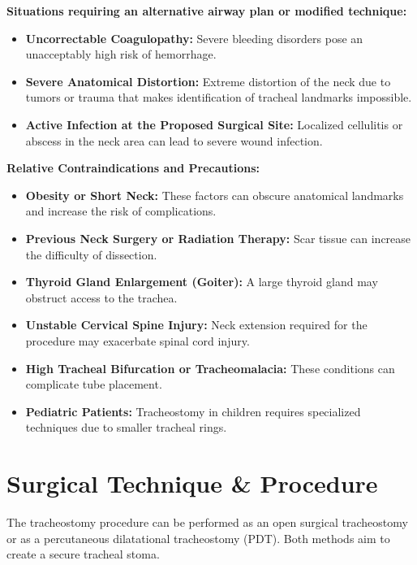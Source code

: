 \textbf{Situations requiring an alternative airway plan or modified technique:}
\begin{itemize}
  \item \textbf{Uncorrectable Coagulopathy:} Severe bleeding disorders pose an unacceptably high risk of hemorrhage.
  
  \item \textbf{Severe Anatomical Distortion:} Extreme distortion of the neck due to tumors or trauma that makes identification of tracheal landmarks impossible.

  \item \textbf{Active Infection at the Proposed Surgical Site:} Localized cellulitis or abscess in the neck area can lead to severe wound infection.
\end{itemize}

\textbf{Relative Contraindications and Precautions:}
\begin{itemize}
  \item \textbf{Obesity or Short Neck:} These factors can obscure anatomical landmarks and increase the risk of complications.

  \item \textbf{Previous Neck Surgery or Radiation Therapy:} Scar tissue can increase the difficulty of dissection.

  \item \textbf{Thyroid Gland Enlargement (Goiter):} A large thyroid gland may obstruct access to the trachea.

  \item \textbf{Unstable Cervical Spine Injury:} Neck extension required for the procedure may exacerbate spinal cord injury.

  \item \textbf{High Tracheal Bifurcation or Tracheomalacia:} These conditions can complicate tube placement.

  \item \textbf{Pediatric Patients:} Tracheostomy in children requires specialized techniques due to smaller tracheal rings.
\end{itemize}

\section*{Surgical Technique \& Procedure}
The tracheostomy procedure can be performed as an open surgical tracheostomy or as a percutaneous dilatational tracheostomy (PDT). Both methods aim to create a secure tracheal stoma.

